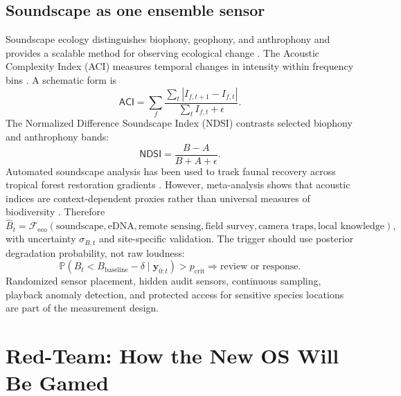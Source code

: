 \documentclass[11pt,a4paper]{article}
\numberwithin{equation}{section}
\theoremstyle{definition}
\theoremstyle{plain}
\theoremstyle{remark}
\newcommand{\Pp}{\mathbb{P}}
\begin{document}
\subsection{Soundscape as one ensemble sensor}

Soundscape ecology distinguishes biophony, geophony, and anthrophony and provides a scalable method for observing ecological change \citep{pijanowski2011}. The Acoustic Complexity Index (ACI) measures temporal changes in intensity within frequency bins \citep{pieretti2011}. A schematic form is
\begin{equation}
\mathsf{ACI}=\sum_f
\frac{\sum_t |I_{f,t+1}-I_{f,t}|}
{\sum_t I_{f,t}+\epsilon}.
\label{eq:aci}
\end{equation}
The Normalized Difference Soundscape Index (NDSI) contrasts selected biophony and anthrophony bands:
\begin{equation}
\mathsf{NDSI}=\frac{B-A}{B+A+\epsilon}.
\label{eq:ndsi}
\end{equation}
Automated soundscape analysis has been used to track faunal recovery across tropical forest restoration gradients \citep{muller2023}. However, meta-analysis shows that acoustic indices are context-dependent proxies rather than universal measures of biodiversity \citep{alcocer2022}. Therefore
\begin{equation}
\widehat B_t=
\mathcal F_{\mathrm{eco}}
\left(
\text{soundscape},\text{eDNA},\text{remote sensing},
\text{field survey},\text{camera traps},\text{local knowledge}
\right),
\label{eq:ecosensorfusion}
\end{equation}
with uncertainty $\sigma_{B,t}$ and site-specific validation. The trigger should use posterior degradation probability, not raw loudness:
\begin{equation}
\Pp(B_t<B_{\mathrm{baseline}}-\delta\mid\bm y_{0:t})>p_{\mathrm{crit}}
\Longrightarrow \text{review or response}.
\label{eq:ecotrigger}
\end{equation}
Randomized sensor placement, hidden audit sensors, continuous sampling, playback anomaly detection, and protected access for sensitive species locations are part of the measurement design.

\section{Red-Team: How the New OS Will Be Gamed}
\end{document}
